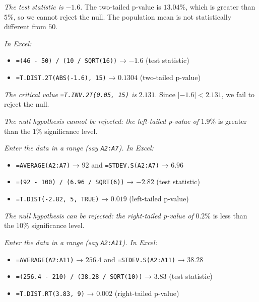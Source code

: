 \documentclass[
  11pt,
  letterpaper,
  DIV=11,
  numbers=noendperiod,
  oneside,
  open=any]{scrreprt}
\providecommand{\tightlist}{%
  \setlength{\itemsep}{0pt}\setlength{\parskip}{0pt}}\usepackage{longtable,booktabs,array}
\newenvironment{bsanswerkey}[2]{%
  \begin{tcolorbox}[bsbase, colback=bspaper2, colframe=bsline, fontupper=\small,
    title={\hypertarget{a-#1}{}\label{a-#1}\hyperlink{q-#1}{\textcolor{bsink2}{\MakeUppercase{#2}}}\hfill
      \hyperlink{q-#1}{\textcolor{bsaccent}{\normalfont\footnotesize back to page \pageref{q-#1}}}}]}%
  {\end{tcolorbox}}
\begin{document}
\begin{bsanswerkey}{bsans122}{Exercise 1, question 1}

\emph{The test statistic is} \(-1.6\). The two-tailed p-value is
\(13.04\%\), which is greater than \(5\%\), so we cannot reject the
null. The population mean is not statistically different from \(50\).

\emph{In Excel:}

\begin{itemize}
\tightlist
\item
  \texttt{=(46\ -\ 50)\ /\ (10\ /\ SQRT(16))} → \(-1.6\) (test
  statistic)
\item
  \texttt{=T.DIST.2T(ABS(-1.6),\ 15)} → \(0.1304\) (two-tailed p-value)
\end{itemize}

\emph{The critical value \texttt{=T.INV.2T(0.05,\ 15)} is} \(2.131\).
Since \(|-1.6| < 2.131\), we fail to reject the null.

\end{bsanswerkey}

\begin{bsanswerkey}{bsans123}{Exercise 1, question 2}

\emph{The null hypothesis cannot be rejected: the left-tailed p-value
of} \(1.9\%\) is greater than the \(1\%\) significance level.

\emph{Enter the data in a range (say \texttt{A2:A7}). In Excel:}

\begin{itemize}
\tightlist
\item
  \texttt{=AVERAGE(A2:A7)} → \(92\) and \texttt{=STDEV.S(A2:A7)} →
  \(6.96\)
\item
  \texttt{=(92\ -\ 100)\ /\ (6.96\ /\ SQRT(6))} → \(-2.82\) (test
  statistic)
\item
  \texttt{=T.DIST(-2.82,\ 5,\ TRUE)} → \(0.019\) (left-tailed p-value)
\end{itemize}

\end{bsanswerkey}

\begin{bsanswerkey}{bsans124}{Exercise 1, question 3}

\emph{The null hypothesis can be rejected: the right-tailed p-value of}
\(0.2\%\) is less than the \(10\%\) significance level.

\emph{Enter the data in a range (say \texttt{A2:A11}). In Excel:}

\begin{itemize}
\tightlist
\item
  \texttt{=AVERAGE(A2:A11)} → \(256.4\) and \texttt{=STDEV.S(A2:A11)} →
  \(38.28\)
\item
  \texttt{=(256.4\ -\ 210)\ /\ (38.28\ /\ SQRT(10))} → \(3.83\) (test
  statistic)
\item
  \texttt{=T.DIST.RT(3.83,\ 9)} → \(0.002\) (right-tailed p-value)
\end{itemize}

\end{bsanswerkey}
\end{document}
